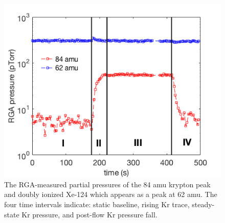 \documentclass[12pt]{article}
\begin{document}
\begin{figure}[h!]
  \includegraphics[width=\linewidth]{Figures/RGA_trace.png}
  \caption{The RGA-measured partial pressures of the 84 amu krypton peak and doubly ionized Xe-124 which appears as a peak at 62 amu. The four time intervals indicate: static baseline, rising Kr trace, steady-state Kr pressure, and post-flow Kr pressure fall.}
  \label{fig:RGAtrace}
\end{figure}
\end{document}
